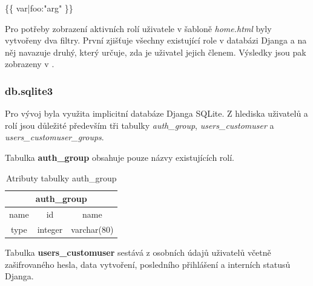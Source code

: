 \textsf{\{\{ var|foo:"arg" \}\}}

Pro potřeby zobrazení aktivních rolí uživatele v šabloně
\textit{home.html} byly vytvořeny dva filtry. První zjišťuje všechny
existující role v databázi Djanga a na něj navazuje druhý, který
určuje, zda je uživatel jejich členem. Výsledky jsou pak zobrazeny v
.

\subsubsection{db.sqlite3}

Pro vývoj byla využita implicitní databáze Djanga SQLite. Z hlediska
uživatelů a rolí jsou důležité především tři tabulky
\textit{auth\_group}, \textit{users\_customuser} a
\textit{users\_customuser\_groups}.

Tabulka \textbf{auth\_group} obsahuje pouze názvy existujících rolí.

\begin{table}[H]
\centering
\begin{tabular}{@{}|c|c|c|@{}}
\toprule
\multicolumn{3}{|c|}{auth\_group} \\ \midrule
name & id & name \\ \midrule
type & integer & varchar(80) \\ \bottomrule
\end{tabular}
\caption{Atributy tabulky auth\_group}
\label{tab:auth-group}
\end{table}

Tabulka \textbf{users\_customuser} sestává z osobních údajů uživatelů
včetně zašifrovaného hesla, data vytvoření, posledního přihlášení a
interních statusů Djanga.

\begin{table}[H]
\centering
{}
\caption{Atributy tabulky users\_customuser 1/2}
\label{tab:users-customuser-1}
\end{table}

\begin{table}[H]
\centering
{}
\caption{Atributy tabulky users\_customuser 2/2}
\label{tab:users-customuser-2}
\end{table}

